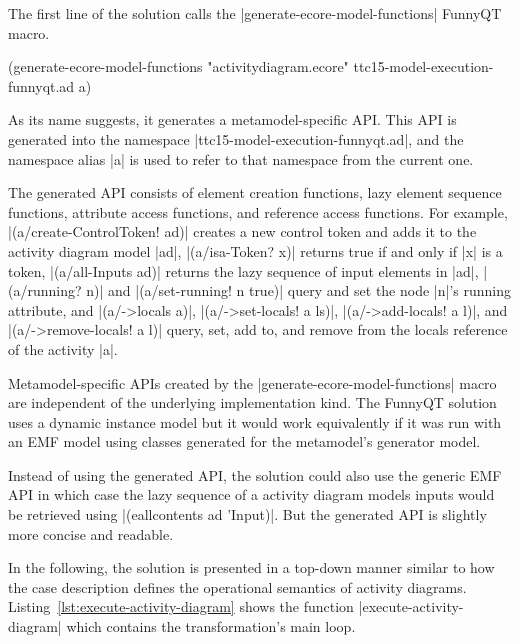 \documentclass[submission]{eptcs}
\newcommand{\code}{\clojureinline}
\begin{document}
The first line of the solution calls the \code|generate-ecore-model-functions|
FunnyQT macro.

\begin{clojurecode}
(generate-ecore-model-functions "activitydiagram.ecore" ttc15-model-execution-funnyqt.ad a)
\end{clojurecode}

As its name suggests, it generates a metamodel-specific API.  This API is
generated into the namespace \code|ttc15-model-execution-funnyqt.ad|, and the
namespace alias \code|a| is used to refer to that namespace from the current
one.

The generated API consists of element creation functions, lazy element sequence
functions, attribute access functions, and reference access functions.  For
example, \code|(a/create-ControlToken! ad)| creates a new control token and
adds it to the activity diagram model \code|ad|, \code|(a/isa-Token? x)|
returns true if and only if \code|x| is a token, \code|(a/all-Inputs ad)|
returns the lazy sequence of input elements in \code|ad|, \code|(a/running? n)|
and \code|(a/set-running! n true)| query and set the node \code|n|'s
\textsf{running} attribute, and \code|(a/->locals a)|, \code|(a/->set-locals! a
ls)|, \code|(a/->add-locals! a l)|, and \code|(a/->remove-locals! a l)| query,
set, add to, and remove from the \textsf{locals} reference of the activity
\code|a|.

Metamodel-specific APIs created by the \code|generate-ecore-model-functions|
macro are independent of the underlying implementation kind.  The FunnyQT
solution uses a dynamic instance model but it would work equivalently if it was
run with an EMF model using classes generated for the metamodel's generator
model.

Instead of using the generated API, the solution could also use the generic EMF
API in which case the lazy sequence of a activity diagram models inputs would
be retrieved using \code|(eallcontents ad 'Input)|.  But the generated API is
slightly more concise and readable.

\bigskip{}

In the following, the solution is presented in a top-down manner similar to how
the case description defines the operational semantics of activity diagrams.
Listing~\vref{lst:execute-activity-diagram} shows the function
\code|execute-activity-diagram| which contains the transformation's main loop.
\end{document}
